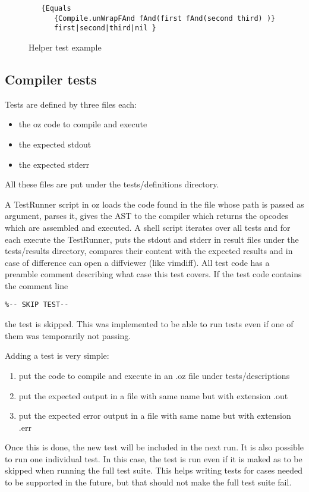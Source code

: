 \documentclass[a4paper]{memoir}
\begin{document}
\begin{figure}
\begin{lstlisting}
   {Equals 
      {Compile.unWrapFAnd fAnd(first fAnd(second third) )}
      first|second|third|nil }
\end{lstlisting}
\label{fig:helperstestsexample}
\caption{Helper test example}
\end{figure}
\subsection{Compiler tests}
Tests are defined by three files each:
\begin{itemize}
  \item the oz code to compile and execute
  \item the expected stdout
  \item the expected stderr
\end{itemize}
All these files are put under the tests/definitions directory.

A TestRunner script in oz loads the code found in the file whose path is passed as argument, parses it, gives the AST to the compiler which returns the opcodes which are assembled and executed. 
A shell script iterates over all tests and for each execute the TestRunner, puts the stdout and stderr in result files under the tests/results directory, compares their content with the expected results and in case of difference can open a diffviewer (like vimdiff).
All test code has a preamble comment describing what case this test covers.
If the test code contains the comment line
\begin{lstlisting}
%-- SKIP TEST-- 
\end{lstlisting}
the test is skipped. This was implemented to be able to run tests even if one of them was temporarily not passing.

Adding a test is very simple:
\begin{enumerate}
  \item put the code to compile and execute in an .oz file under tests/descriptions
  \item put the expected output in a file with same name but with extension .out
  \item put the expected error output in a file with same name but with extension .err
\end{enumerate}
Once this is done, the new test will be included in the next run.
It is also possible to run one individual test. In this case, the test is run even if it is maked as to be skipped when running the full test suite. This helps writing tests for cases needed to be supported in the future, but that should not make the full test suite fail.
\end{document}
